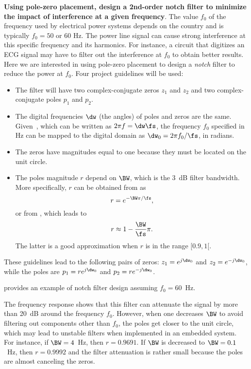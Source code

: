 \bExample \textbf{Using pole-zero placement, design a 2nd-order notch filter to minimize the impact of interference at a given frequency}.
The value $f_0$ of the  frequency used by electrical power systems depends on the country and is typically $f_0=50$ or 60 Hz.
The power line signal can cause strong interference at this specific frequency and its harmonics.
For instance, a circuit that digitizes an ECG signal may have to filter out the interference at $f_0$ to obtain better results.
Here we are interested in using pole-zero placement to design a \emph{notch} filter to reduce the
power at $f_0$. Four project guidelines will be used:

\begin{itemize}
	\item The filter will have two complex-conjugate zeros $z_1$ and $z_2$ and two complex-conjugate poles $p_1$ and $p_2$.
	\item The digital frequencies $\dw$ (the angles) of poles and zeros are the same. Given~, which
	can be written as $2 \pi f = \dw \fs$, 
	the frequency $f_0$ specified in Hz can be mapped to the digital domain as $\dw_0 = 2 \pi f_0 / \fs$, in radians.
	\item The zeros have magnitudes equal to one because they must be located on the unit circle.
	\item The poles magnitude $r$ depend on $\BW$, which is the 3~dB filter bandwidth. More specifically, $r$ can be obtained from  as
	\[
	r = e^{- \BW \pi / \fs},
	\]
	or from , which leads to
	\[
	r \approx 1 - \frac{\BW}{\fs} \pi.
	\]
	The latter is a good approximation when $r$ is in the range $[0.9, 1[$.
\end{itemize}

These guidelines lead to the following pairs of zeros: $z_1 = e^{j \dw_0}$ and $z_2 = e^{-j \dw_0}$, while the poles are $p_1 = r e^{j \dw_0}$ and $p_2 = r e^{-j \dw_0}$.

 provides an example of notch filter design assuming $f_0=60$~Hz.


The frequency response shows that this filter can attenuate the signal by more than 20~dB around the frequency $f_0$.
However, when one decreases $\BW$ to avoid filtering out components other than $f_0$, the poles get closer to the unit circle,
which may lead to unstable filters when implemented in an embedded system. For instance, if $\BW=4$~Hz, then $r=0.9691$.
If $\BW$ is decreased to $\BW=0.1$~Hz, then $r=0.9992$ and the filter attenuation is rather small because the poles are almost canceling the zeros.
\eExample

